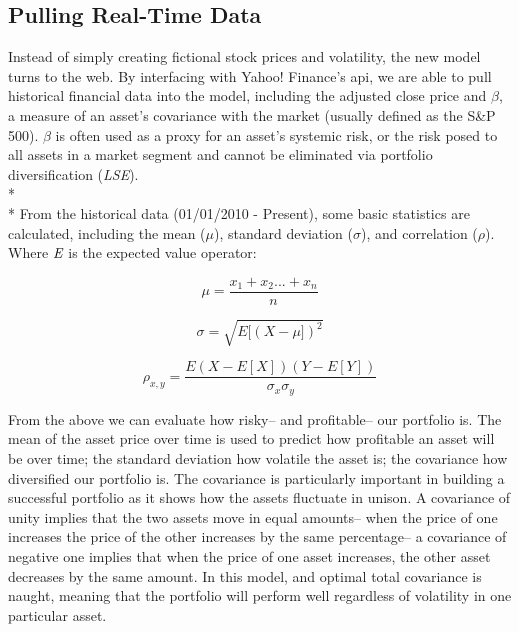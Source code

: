 \documentclass[12pt]{article}
\begin{document}
\subsection{Pulling Real-Time Data}
Instead of simply creating fictional stock prices and volatility, the new model turns to the web. By interfacing with Yahoo! Finance's api, we are able to pull historical financial data into the model, including the adjusted close price and ${\beta}$, a measure of an asset's covariance with the market (usually defined as the S\&P 500). ${\beta}$ is often used as a proxy for an asset's systemic risk, or the risk posed to all assets in a market segment and cannot be eliminated via portfolio diversification (\emph{LSE}). \\*\\*
From the historical data (01/01/2010 - Present), some basic statistics are calculated, including the mean (${\mu}$), standard deviation (${\sigma}$), and correlation (${\rho}$). Where ${\emph E}$ is the expected value operator:



\begin{equation}
	\mu = \frac{x_{1} + x_{2} ... + x_{n}} {n}
\end{equation}	

\begin{equation}
	\sigma = \sqrt{E[(X - \mu])^{2}}
\end{equation}	
	
\begin{equation}
	\rho_{x,y} = \frac{E(X - E[X])(Y-E[Y])}{\sigma_{x}\sigma_{y}}
\end{equation}

From the above we can evaluate how risky-- and profitable-- our portfolio is. The mean of the asset price over time is used to predict how profitable an asset will be over time; the standard deviation how volatile the asset is; the covariance how diversified our portfolio is. The covariance is particularly important in building a successful portfolio as it shows how the assets fluctuate in unison. A covariance of unity implies that the two assets move in equal amounts-- when the price of one increases the price of the other increases by the same percentage-- a covariance of negative one implies that when the price of one asset increases, the other asset decreases by the same amount. In this model, and optimal total covariance is naught, meaning that the portfolio will perform well regardless of volatility in one particular asset.
\end{document}
